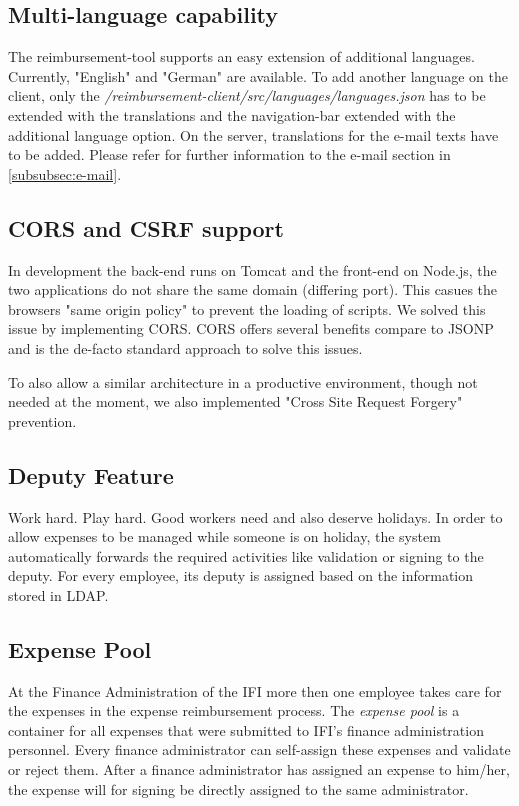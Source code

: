 \subsection{Multi-language capability}
The reimbursement-tool supports an easy extension of additional languages. Currently, "English" and "German" are available. To add another language on the client, only the \textit{/reimbursement-client/src/languages/languages.json} has to be extended with the translations and the navigation-bar extended with the additional language option. \newline 
On the server, translations for the e-mail texts have to be added. Please refer for further information to the e-mail section in \ref{subsubsec:e-mail}.

\subsection{CORS and CSRF support}
In development the back-end runs on Tomcat and the front-end on Node.js, the two applications do not share the same domain (differing port). This casues the browsers "same origin policy" to prevent the loading of scripts. We solved this issue by implementing CORS. CORS offers several benefits compare to JSONP and is the de-facto standard approach to solve this issues. \par 

To also allow a similar architecture in a productive environment, though not needed at the moment, we also implemented "Cross Site Request Forgery" prevention.

\subsection{Deputy Feature}
Work hard. Play hard. Good workers need and also deserve holidays. In order to allow expenses to be managed while someone is on holiday, the system automatically forwards the required activities like validation or signing to the deputy. For every employee, its deputy is assigned based on the information stored in LDAP.

\subsection{Expense Pool}
At the Finance Administration of the IFI more then one employee takes care for the expenses in the expense reimbursement process. The \textit{expense pool} is a container for all expenses that were submitted to IFI's finance administration personnel. Every finance administrator can self-assign these expenses and validate or reject them. After a finance administrator has assigned an expense to him/her, the expense will for signing be directly assigned to the same administrator.


